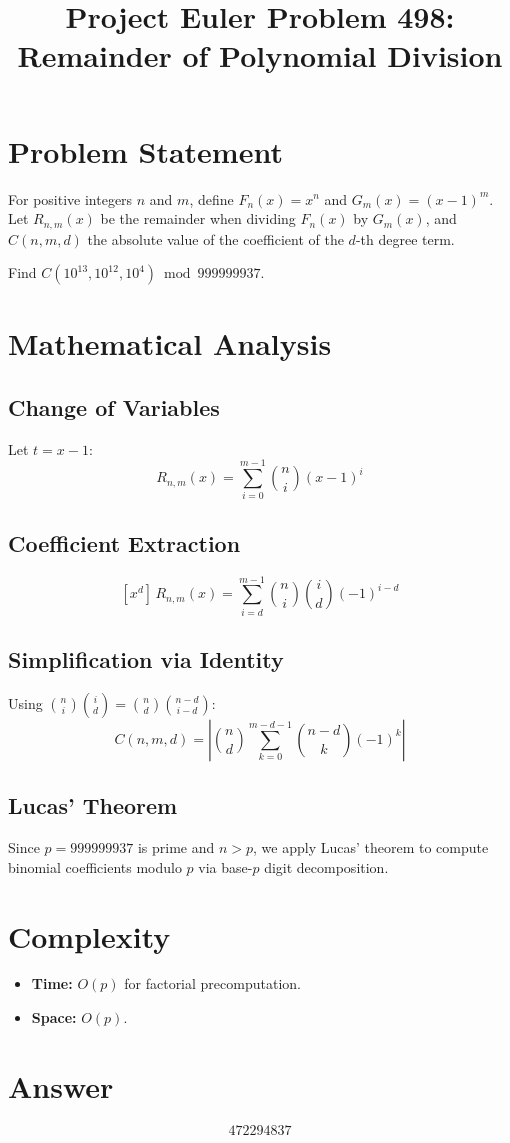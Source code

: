\documentclass[12pt]{article}
\title{Project Euler Problem 498: Remainder of Polynomial Division}
\author{}
\date{}
\begin{document}
\maketitle

\section{Problem Statement}
For positive integers $n$ and $m$, define $F_n(x) = x^n$ and $G_m(x) = (x-1)^m$. Let $R_{n,m}(x)$ be the remainder when dividing $F_n(x)$ by $G_m(x)$, and $C(n,m,d)$ the absolute value of the coefficient of the $d$-th degree term.

Find $C(10^{13}, 10^{12}, 10^4) \bmod 999999937$.

\section{Mathematical Analysis}

\subsection{Change of Variables}
Let $t = x - 1$:
\[
R_{n,m}(x) = \sum_{i=0}^{m-1} \binom{n}{i}(x-1)^i
\]

\subsection{Coefficient Extraction}
\[
[x^d]\, R_{n,m}(x) = \sum_{i=d}^{m-1} \binom{n}{i}\binom{i}{d}(-1)^{i-d}
\]

\subsection{Simplification via Identity}
Using $\binom{n}{i}\binom{i}{d} = \binom{n}{d}\binom{n-d}{i-d}$:
\[
C(n,m,d) = \left|\binom{n}{d} \sum_{k=0}^{m-d-1}\binom{n-d}{k}(-1)^k\right|
\]

\subsection{Lucas' Theorem}
Since $p = 999999937$ is prime and $n > p$, we apply Lucas' theorem to compute binomial coefficients modulo $p$ via base-$p$ digit decomposition.

\section{Complexity}
\begin{itemize}
    \item \textbf{Time:} $O(p)$ for factorial precomputation.
    \item \textbf{Space:} $O(p)$.
\end{itemize}

\section{Answer}

\[
\boxed{472294837}
\]
\end{document}
